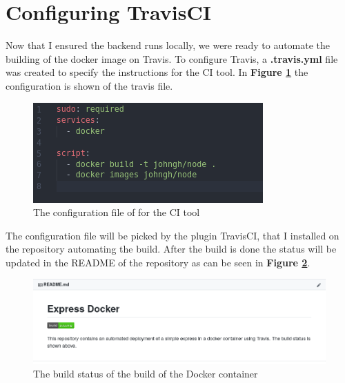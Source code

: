 \documentclass{paper}
\begin{document}
    \section{Configuring TravisCI}{Now that I ensured the backend runs locally, we were ready to automate the building 
    of the docker image on Travis. To configure Travis, a \textbf{.travis.yml} file was created to specify the instructions 
    for the CI tool. In \textbf{Figure \ref{fig:travis}} the configuration is shown of the travis file.
    \begin{figure}[!h]
        \centering
        \includegraphics[scale=3, pagebox=artbox]{Images/travis.png}
        \caption{The configuration file of for the CI tool}
        \label{fig:travis}
    \end{figure}
    \newline
    The configuration file will be picked by the plugin TravisCI, that I installed on the repository automating the build. After
    the build is done the status will be updated in the README of the repository as can be seen in \textbf{Figure \ref{fig:result}}.
    \begin{figure}[!h]
        \centering
        \includegraphics[scale=1.4, pagebox=artbox]{Images/README.png}
        \caption{The build status of the build of the Docker container}
        \label{fig:result}
    \end{figure}
    }
\end{document}
